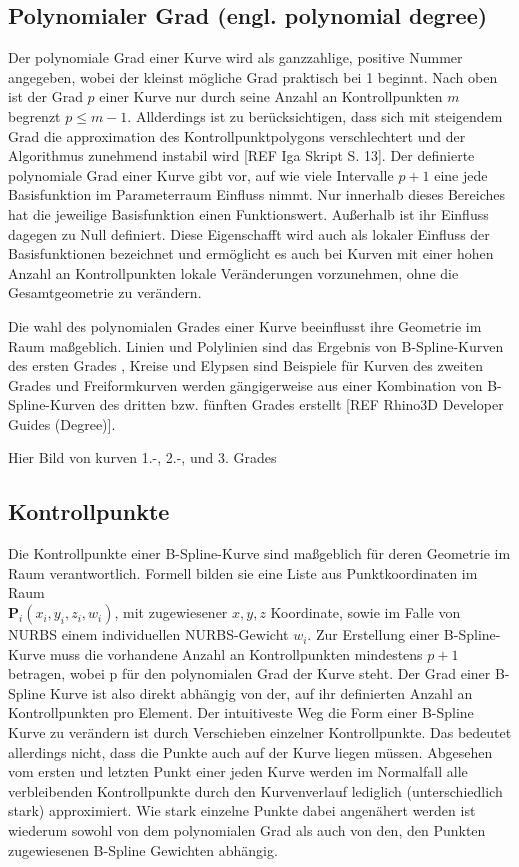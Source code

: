\documentclass[german,a4paper,12pt,oneside]{scrbook}
\theoremstyle{definition}
\theoremstyle{definition}
\theoremstyle{definition}
\theoremstyle{definition}
\theoremstyle{definition}
\theoremstyle{definition}
\begin{document}
\subsection{Polynomialer Grad (engl. polynomial degree)}
Der polynomiale Grad einer Kurve wird als ganzzahlige, positive Nummer angegeben, wobei der kleinst mögliche Grad praktisch bei 1 beginnt. Nach oben ist der Grad $p$ einer Kurve nur durch seine Anzahl an Kontrollpunkten $m$ begrenzt $p \leq m - 1$. Allderdings ist zu berücksichtigen, dass sich mit steigendem Grad die approximation des Kontrollpunktpolygons verschlechtert und der Algorithmus zunehmend instabil wird [REF Iga Skript S. 13]. Der definierte polynomiale Grad einer Kurve gibt vor, auf wie viele Intervalle $p+1$ eine jede Basisfunktion im Parameterraum Einfluss nimmt. Nur innerhalb dieses Bereiches hat die jeweilige Basisfunktion einen Funktionswert. Außerhalb ist ihr Einfluss dagegen zu Null definiert. Diese Eigenschafft wird auch als lokaler Einfluss der Basisfunktionen bezeichnet und ermöglicht es auch bei Kurven mit einer hohen Anzahl an Kontrollpunkten lokale Veränderungen vorzunehmen, ohne die Gesamtgeometrie zu verändern.

Die wahl des polynomialen Grades einer Kurve beeinflusst ihre Geometrie im Raum maßgeblich. Linien und Polylinien sind das Ergebnis von B-Spline-Kurven des ersten Grades , Kreise und Elypsen sind Beispiele für Kurven des zweiten Grades und Freiformkurven werden gängigerweise aus einer Kombination von B-Spline-Kurven des dritten bzw. fünften Grades erstellt [REF Rhino3D Developer Guides (Degree)].

\large
\vspace{1.5cm}
\hfil
Hier Bild von kurven 1.-, 2.-, und 3. Grades

\normalsize
\subsection{Kontrollpunkte}
Die Kontrollpunkte einer B-Spline-Kurve sind maßgeblich für deren Geometrie im Raum verantwortlich. Formell bilden sie eine Liste aus Punktkoordinaten im Raum \\ $\bm{P}_i(x_i, y_i, z_i, w_i)$, mit zugewiesener $x, y, z$ Koordinate, sowie im Falle von NURBS einem individuellen NURBS-Gewicht $w_i$. Zur Erstellung einer B-Spline-Kurve muss die vorhandene Anzahl an Kontrollpunkten mindestens $p+1$ betragen, wobei p für den polynomialen Grad der Kurve steht. Der Grad einer B-Spline Kurve ist also direkt abhängig von der, auf ihr definierten Anzahl an Kontrollpunkten pro Element. Der intuitiveste Weg die Form einer B-Spline Kurve zu verändern ist durch Verschieben einzelner Kontrollpunkte. Das bedeutet allerdings nicht, dass die Punkte auch auf der Kurve liegen müssen. Abgesehen vom ersten und letzten Punkt einer jeden Kurve werden im Normalfall alle verbleibenden Kontrollpunkte durch den Kurvenverlauf lediglich (unterschiedlich stark) approximiert. Wie stark einzelne Punkte dabei angenähert werden ist wiederum sowohl von dem polynomialen Grad als auch von den, den Punkten zugewiesenen B-Spline Gewichten abhängig.
\end{document}
